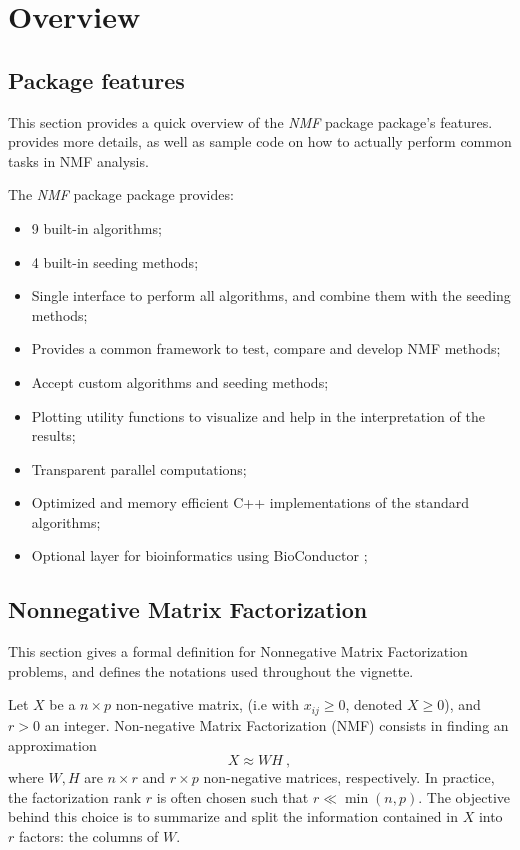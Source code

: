 \documentclass[a4paper]{article}\usepackage{graphicx, color}
\newcommand{\pkgname}[1]{\textit{#1}\xspace}
\newcommand{\Rpkg}[1]{\pkgname{#1} package\xspace}
\newcommand{\nmfpack}{\Rpkg{NMF}}
\begin{document}
\pagebreak
\tableofcontents
\pagebreak

\section{Overview}

\subsection{Package features}

This section provides a quick overview of the \nmfpack package's features.
 provides more details, as well as sample code on how to actually perform common tasks in NMF analysis.




The \nmfpack package provides:
\begin{itemize}
\item 9 built-in algorithms;
\item 4 built-in seeding methods;
\item Single interface to perform all algorithms, and combine them with the seeding methods;
\item Provides a common framework to test, compare and develop NMF methods;
\item Accept custom algorithms and seeding methods;
\item Plotting utility functions to visualize and help in the interpretation of the results;
\item Transparent parallel computations;
\item Optimized and memory efficient C++ implementations of the standard algorithms;
\item Optional layer for bioinformatics using BioConductor \cite{Gentleman2004};
\end{itemize}

\subsection{Nonnegative Matrix Factorization}

This section gives a formal definition for Nonnegative Matrix Factorization problems, and defines the notations used throughout the vignette. 

Let $X$ be a $n \times p$ non-negative matrix, (i.e with $x_{ij} \geq 0$,
denoted $X \geq 0$), and $r > 0$ an integer. Non-negative Matrix Factorization (NMF) consists in finding an approximation
\begin{equation}\label{NMFstd}
X \approx W H\ ,
\end{equation}
where $W, H$ are $n\times r$ and $r \times p$ non-negative matrices, respectively. 
In practice, the factorization rank $r$ is often chosen such that $r \ll \min(n, p)$. 
The objective behind this choice is to summarize and split the information contained in $X$ into $r$ factors: the columns of $W$. 
\end{document}

